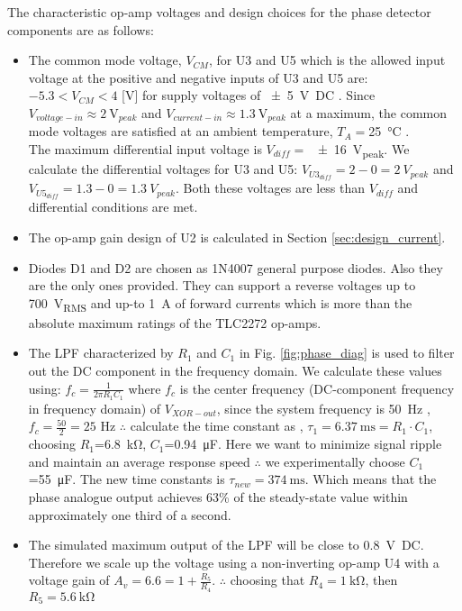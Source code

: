 The characteristic op-amp voltages and design choices for the phase detector components are as follows:
\begin{itemize}
     \item The common mode voltage, $V_{CM}$, for U3 and U5 which is the allowed input voltage at the positive and negative inputs of U3 and U5 are: \\$-5.3<V_{CM}<4$ [V] for supply voltages of \SI{+-5}{\volt DC} \cite{TLC2272}. Since $V_{voltage-in}\approx \SI{2}{\volt_{peak}}$ and $V_{current-in}\approx \SI{1.3}{\volt_{peak}}$ at a maximum, the common mode voltages are satisfied at an ambient temperature, $T_A=$\SI{25}{\degreeCelsius} \cite{TLC2272}.\\The maximum differential input voltage is $V_{diff}=$ \SI{+-16}{V_{peak}}. We calculate the differential voltages for U3 and U5: $V_{U3_{diff}}=2-0=\SI{2}{V_{peak}}$ and $V_{U5_{diff}}=1.3-0=\SI{1.3}{V_{peak}}$. Both these voltages are less than $V_{diff}$ and differential conditions are met.
     \item The op-amp gain design of U2 is calculated in Section \ref{sec:design_current}.
     \item Diodes D1 and D2 are chosen as 1N4007 general purpose diodes. Also they are the only ones provided. They can support a reverse voltages up to \SI{700}{V_{RMS}} and up-to \SI{1}{\ampere} of forward currents \cite{1N4007} which is more than the absolute maximum ratings of the TLC2272 op-amps\cite{TLC2272}.
     \item The LPF characterized by $R_1$ and $C_1$ in Fig. \ref{fig:phase_diag} is used to filter out the DC component in the frequency domain.
     We calculate these values using: $f_c=\frac{1}{2 \pi R_1 C_1}$ \cite{DC_Analogue} where $f_c$ is the center frequency (DC-component frequency in frequency domain) of $V_{XOR-out}$, since the system frequency is \SI{50}{\hertz} \cite{DC_Analogue}, \\$f_c=\frac{50}{2}=25$ Hz $\therefore$ calculate the time constant as , $\tau_{1}=\SI{6.37}{\milli\second}=R_1 \cdot C_1$, choosing $R_1$=\SI{6.8}{\kilo\ohm}, $C_1$=\SI{0.94}{\micro\farad}. Here we want to minimize  signal ripple and maintain an average response speed $\therefore$ we experimentally choose $C_1$=\SI{55}{\micro\farad}. The new time constants is $\tau_{new}=\SI{374}{\milli\second}$. Which means that the phase analogue output achieves 63\% of the steady-state value within approximately one third of a second.
     \item The simulated maximum output of the LPF will be close to \SI{0.8}{\volt DC}. Therefore we scale up the voltage using a non-inverting op-amp U4 with a voltage gain of  $A_v=6.6=1+\frac{R_5}{R_4}$. $\therefore$ choosing that $R_4=\SI{1}{\kilo\ohm}$, then $R_5=\SI{5.6}{\kilo\ohm}$
\end{itemize}


